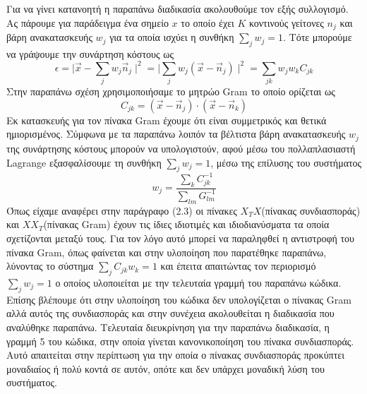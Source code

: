 Για να γίνει κατανοητή η παραπάνω διαδικασία ακολουθούμε τον εξής συλλογισμό. Ας πάρουμε για παράδειγμα ένα σημείο $x$ το οποίο έχει $K$ κοντινούς γείτονες $n_{j}$ και βάρη ανακατασκευής $w_{j}$ για τα οποία ισχύει η συνθήκη $\sum_{j} w_{j} = 1$. Τότε μπορούμε να γράψουμε την συνάρτηση κόστους ως
\newline\hspace*{\fill}
\begin{equation}
        \epsilon = \mid \overrightarrow{x} - \sum_{j} w_{j}\overrightarrow{n}_{j} \mid ^{2} = \mid \sum_{j} w_{j}(\overrightarrow{x}-\overrightarrow{n}_{j}) \mid ^{2} = \sum_{jk} w_{j}w_{k}C_{jk}
\end{equation}
\hspace*{\fill}\newline
Στην παραπάνω σχέση χρησιμοποιήσαμε το μητρώο \textlatin{Gram} το οποίο ορίζεται ως
\newline\hspace*{\fill}
\begin{equation}
        C_{jk} = (\overrightarrow{x}-\overrightarrow{n}_{j})
        \cdot(\overrightarrow{x}-\overrightarrow{n}_{k})
\end{equation}
\hspace*{\fill}\newline
Εκ κατασκευής για τον πίνακα \textlatin{Gram} έχουμε ότι είναι συμμετρικός και θετικά ημιορισμένος. Σύμφωνα με τα παραπάνω λοιπόν τα βέλτιστα βάρη ανακατασκευής $w_{j}$ της συνάρτησης κόστους μπορούν να υπολογιστούν, αφού μέσω του πολλαπλασιαστή \textlatin{Lagrange} εξασφαλίσουμε τη συνθήκη $\sum_{j} w_{j} = 1$, μέσω της επίλυσης του συστήματος
\newline\hspace*{\fill}
\begin{equation}
	w_{j} = \dfrac{\sum_{k}C_{jk}^{-1}}{\sum_{lm}G_{lm}^{-1}}
\end{equation}
\hspace*{\fill}\newline
Όπως είχαμε αναφέρει στην παράγραφο (2.3) οι πίνακες $X_{T}X$(πίνακας συνδιασποράς) και $XX_{T}$(πίνακας \textlatin{Gram}) έχουν τις ίδιες ιδιοτιμές και ιδιοδιανύσματα τα οποία σχετίζονται μεταξύ τους. Για τον λόγο αυτό μπορεί να παραληφθεί η αντιστροφή του πίνακα \textlatin{Gram}, όπως φαίνεται και στην υλοποίηση που παρατέθηκε παραπάνω, λύνοντας το σύστημα $\sum_{j}C_{jk}w_{k}=1$ και έπειτα απαιτώντας τον περιορισμό $\sum_{j} w_{j}=1$ ο οποίος υλοποιείται με την τελευταία γραμμή του παραπάνω κώδικα. Επίσης βλέπουμε ότι στην υλοποίηση του κώδικα δεν υπολογίζεται ο πίνακας \textlatin{Gram} αλλά αυτός της συνδιασποράς και στην συνέχεια ακολουθείται η διαδικασία που αναλύθηκε παραπάνω. Τελευταία διευκρίνηση για την παραπάνω διαδικασία, η γραμμή 5 του κώδικα, στην οποία γίνεται κανονικοποίηση του πίνακα συνδιασποράς. Αυτό απαιτείται στην περίπτωση για την οποία ο πίνακας συνδιασποράς προκύπτει μοναδιαίος ή πολύ κοντά σε αυτόν, οπότε και δεν υπάρχει μοναδική λύση του συστήματος.
